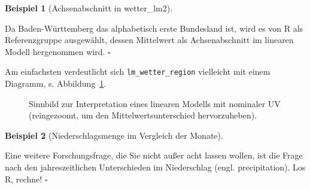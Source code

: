 \documentclass[
  letterpaper,
  twoside,
  open=any]{scrbook}
\theoremstyle{definition}
\theoremstyle{definition}
\theoremstyle{definition}
\newtheorem{example}{Beispiel}[chapter]
\theoremstyle{remark}
\begin{document}
\begin{example}[Achsenabschnitt in
wetter\_lm2]\protect\hypertarget{exm-bawü}{}\label{exm-bawü}

Da Baden-Württemberg das alphabetisch erste Bundesland ist, wird es von
R als Referenzgruppe ausgewählt, dessen Mittelwert als Achsenabschnitt
im linearen Modell hergenommen wird. \(\square\)

\end{example}

Am einfachsten verdeutlicht sich \texttt{lm\_wetter\_region} vielleicht
mit einem Diagramm, s. Abbildung~\ref{fig-bin-nom}.

\begin{figure}


\caption{\label{fig-bin-nom}Sinnbild zur Interpretation eines linearen
Modells mit nominaler UV (reingezoomt, um den Mittelwertsunterschied
hervorzuheben).}

\end{figure}%

\begin{example}[Niederschlagsmenge im Vergleich der
Monate]\protect\hypertarget{exm-months}{}\label{exm-months}

Eine weitere Forschungsfrage, die Sie nicht außer acht lassen wollen,
ist die Frage nach den jahreszeitlichen Unterschieden im Niederschlag
(engl. precipitation). Los R, rechne! \(\square\)

\end{example}
\end{document}
